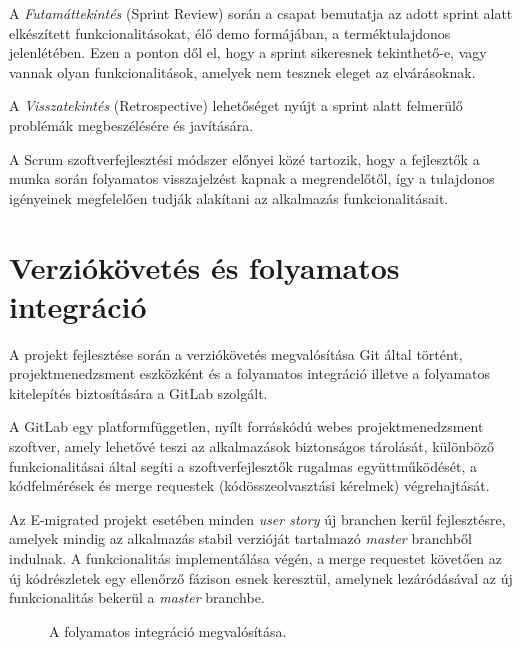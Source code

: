 A \textit{Futamáttekintés} (Sprint Review) során a csapat bemutatja az adott sprint alatt elkészített funkcionalitásokat, élő demo formájában, a terméktulajdonos jelenlétében. Ezen a ponton dől el, hogy a sprint sikeresnek tekinthető-e, vagy vannak olyan funkcionalitások, amelyek nem tesznek eleget az elvárásoknak. 

A \textit{Visszatekintés} (Retrospective) lehetőséget nyújt a sprint alatt felmerülő problémák megbeszélésére és javítására.

A Scrum szoftverfejlesztési módszer előnyei közé tartozik, hogy a fejlesztők a munka során folyamatos visszajelzést kapnak a megrendelőtől, így a tulajdonos igényeinek megfelelően tudják alakítani az alkalmazás funkcionalitásait.

\section{Verziókövetés és folyamatos integráció}
A projekt fejlesztése során a verziókövetés megvalósítása Git által történt, projektmenedzsment eszközként és a folyamatos integráció  \cite{CI} illetve a folyamatos kitelepítés \cite{CD}  biztosítására a GitLab szolgált. 

A GitLab egy platformfüggetlen, nyílt forráskódú webes projektmenedzsment szoftver, amely lehetővé teszi az alkalmazások biztonságos tárolását, különböző funkcionalitásai által segíti a szoftverfejlesztők rugalmas együttműködését, a kódfelmérések és merge requestek (kódösszeolvasztási kérelmek)  végrehajtását\cite{GitLabRegistry}. 

Az E-migrated projekt esetében minden \textit{user story} új branchen kerül fejlesztésre, amelyek mindig az alkalmazás stabil verzióját tartalmazó \textit{master} branchből indulnak. A funkcionalitás implementálása végén, a merge requestet követően az új kódrészletek egy ellenőrző fázison esnek keresztül, amelynek lezáródásával az új funkcionalitás bekerül a \textit{master} branchbe. 
\begin{figure}[!b]
  \centering
  \caption{A folyamatos integráció megvalósítása. }
  \label{fig:continuous_integration}
\end{figure}

